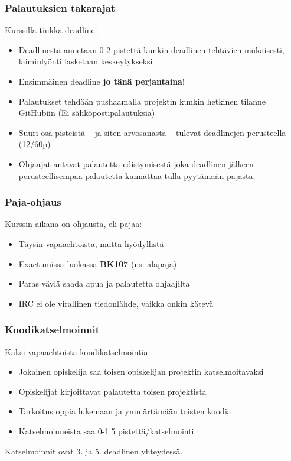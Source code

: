 \documentclass[finnish]{beamer}
\begin{document}
	\begin{frame}
		\frametitle{Palautuksien takarajat}

		Kurssilla tiukka deadline:
		\begin{itemize}
			\item Deadlinestä annetaan 0-2 pistettä kunkin deadlinen tehtävien mukaisesti, laiminlyönti lasketaan keskeytykseksi
			\item Ensimmäinen deadline \textbf{jo tänä perjantaina}!
			\item Palautukset tehdään pushaamalla projektin kunkin hetkinen tilanne GitHubiin (Ei sähköpostipalautuksia)
			\item Suuri osa pisteistä -- ja siten arvosanasta -- tulevat deadlinejen perusteella (12/60p)
			\item Ohjaajat antavat palautetta edistymisestä joka deadlinen jälkeen -- perusteellisempaa palautetta kannattaa tulla pyytämään pajasta.
		\end{itemize}
	\end{frame}
	
	\begin{frame}
		\frametitle{Paja-ohjaus}

		Kurssin aikana on ohjausta, eli pajaa:
		\begin{itemize}
			\item Täysin vapaaehtoista, mutta hyödyllistä
			\item Exactumissa luokassa \textbf{BK107} (ns. alapaja)
			\item Paras väylä saada apua ja palautetta ohjaajilta
			\item IRC ei ole virallinen tiedonlähde, vaikka onkin kätevä
		\end{itemize}
	\end{frame}
	
	\begin{frame}
		\frametitle{Koodikatselmoinnit}
		
		Kaksi vapaaehtoista koodikatselmointia:
		\begin{itemize}
			\item Jokainen opiskelija saa toisen opiskelijan projektin katselmoitavaksi
			\item Opiskelijat kirjoittavat palautetta toisen projektista
			\item Tarkoitus oppia lukemaan ja ymmärtämään toisten koodia
			\item Katselmoinneista saa 0-1.5 pistettä/katselmointi.
		\end{itemize}
		Katselmoinnit ovat 3. ja 5. deadlinen yhteydessä.
	\end{frame}
	
\end{document}
